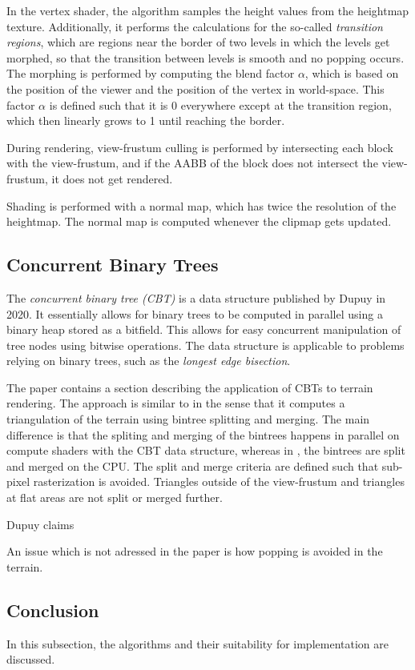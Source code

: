 In the vertex shader, the algorithm samples the height values from the heightmap texture.
Additionally, it performs the calculations for the so-called \textit{transition regions}, 
which are regions near the border of two levels in which 
the levels get morphed, so that the transition between levels is smooth and no popping occurs.
The morphing is performed by computing the blend factor $\alpha$,
which is based on the position of the viewer and the position of the vertex in world-space.
This factor $\alpha$ is defined such that it is 0 everywhere except at the transition region,
which then linearly grows to 1 until reaching the border.

During rendering, view-frustum culling is performed by intersecting each block with the view-frustum,
and if the AABB of the block does not intersect the view-frustum, it does not get rendered.

Shading is performed with a normal map, which has twice the resolution of the heightmap.
The normal map is computed whenever the clipmap gets updated.

\subsection{Concurrent Binary Trees}
The \textit{concurrent binary tree (CBT)} is a data structure published by Dupuy in 2020.
It essentially allows for binary trees to be computed in parallel using a binary heap 
stored as a bitfield. This allows for easy concurrent manipulation of tree nodes using bitwise operations.
The data structure is applicable to problems relying on binary trees, 
such as the \textit{longest edge bisection}.

The paper contains a section describing the application of CBTs to terrain rendering.
The approach is similar to \cite{roam} in the sense that it computes a triangulation of the terrain using bintree splitting and merging.
The main difference is that the spliting and merging of the bintrees happens in parallel on compute shaders with the 
CBT data structure, whereas in \cite{roam}, the bintrees are split and merged on the CPU.
The split and merge criteria are defined such that sub-pixel rasterization is avoided.
Triangles outside of the view-frustum and triangles at flat areas are not split or merged further.

Dupuy claims

An issue which is not adressed in the paper is how popping is avoided in the terrain.

\subsection{Conclusion}
In this subsection, the algorithms and their suitability for implementation are discussed.

